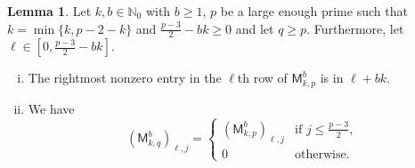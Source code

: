 \documentclass[12pt,reqno]{amsart}
\newcommand{\NN}{\mathbb{N}}
\renewcommand{\geq}{\geqslant}
\renewcommand{\leq}{\leqslant}
\newcommand{\M}{\mathsf{M}}
\theoremstyle{definition}
\newtheorem{lem}[thm]{Lemma}
\numberwithin{equation}{section}
\begin{document}
\begin{lem}\label{L:MpMqGeneral}
	 Let $k,b\in\NN_0$ with $b\geq 1$, $p$ be a large enough prime such that $k=\min\{k,p-2-k\}$ and $\frac{p-3}{2}-bk\geq 0$ and let $q\geq p$. Furthermore, let $\ell \in [0,\frac{p-3}{2} - bk]$.
	\begin{enumerate}[(i)]
		\item The rightmost nonzero entry in the $\ell$th row of $\M_{k,p}^b$ is in $\ell+bk$.
	 \item We have \[(\M_{k,q}^b)_{\ell,j}=\left \{\begin{array}{ll} (\M_{k,p}^b)_{\ell,j}& \text{if $j\leq \frac{p-3}{2}$,}\\ 0&\text{otherwise.}\end{array}\right .\]
	 \end{enumerate}
\end{lem}
\end{document}

